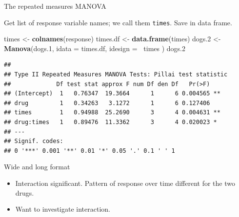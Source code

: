 \documentclass[ignorenonframetext,]{beamer}
\newenvironment{Shaded}{\begin{snugshade}}{\end{snugshade}}
\newcommand{\DataTypeTok}[1]{\textcolor[rgb]{0.13,0.29,0.53}{#1}}
\newcommand{\FloatTok}[1]{\textcolor[rgb]{0.00,0.00,0.81}{#1}}
\newcommand{\KeywordTok}[1]{\textcolor[rgb]{0.13,0.29,0.53}{\textbf{#1}}}
\newcommand{\NormalTok}[1]{#1}
\newcommand{\OperatorTok}[1]{\textcolor[rgb]{0.81,0.36,0.00}{\textbf{#1}}}
\newcommand{\StringTok}[1]{\textcolor[rgb]{0.31,0.60,0.02}{#1}}
\begin{document}
\begin{frame}[fragile]{The repeated measures MANOVA}
\protect\hypertarget{the-repeated-measures-manova}{}

Get list of response variable names; we call them \texttt{times}. Save
in data frame.

\footnotesize

\begin{Shaded}
\begin{Highlighting}[]
\NormalTok{times <-}\StringTok{ }\KeywordTok{colnames}\NormalTok{(response)}
\NormalTok{times.df <-}\StringTok{ }\KeywordTok{data.frame}\NormalTok{(times)}
\NormalTok{dogs}\FloatTok{.2}\NormalTok{ <-}\StringTok{ }\KeywordTok{Manova}\NormalTok{(dogs}\FloatTok{.1}\NormalTok{,}
  \DataTypeTok{idata =}\NormalTok{ times.df,}
  \DataTypeTok{idesign =} \OperatorTok{~}\NormalTok{times}
\NormalTok{)}
\NormalTok{dogs}\FloatTok{.2}
\end{Highlighting}
\end{Shaded}

\begin{verbatim}
## 
## Type II Repeated Measures MANOVA Tests: Pillai test statistic
##             Df test stat approx F num Df den Df   Pr(>F)   
## (Intercept)  1   0.76347  19.3664      1      6 0.004565 **
## drug         1   0.34263   3.1272      1      6 0.127406   
## times        1   0.94988  25.2690      3      4 0.004631 **
## drug:times   1   0.89476  11.3362      3      4 0.020023 * 
## ---
## Signif. codes:  
## 0 '***' 0.001 '**' 0.01 '*' 0.05 '.' 0.1 ' ' 1
\end{verbatim}

\normalsize

\end{frame}

\begin{frame}{Wide and long format}
\protect\hypertarget{wide-and-long-format}{}

\begin{itemize}
\item
  Interaction significant. Pattern of response over time different for
  the two drugs.
\item
  Want to investigate interaction.
\end{itemize}

\end{frame}
\end{document}
